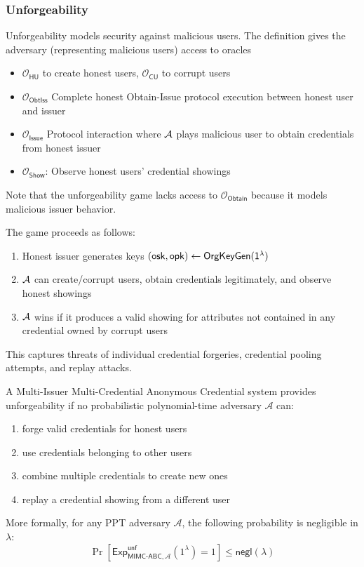 \newpage

\subsubsection{Unforgeability}
Unforgeability models security against malicious users. The definition gives the adversary (representing malicious users) access to oracles 
\begin{itemize}
    \item $\mathcal{O}_{\mathsf{HU}}$ to create honest users, $\mathcal{O}_{\mathsf{CU}}$ to corrupt users
    \item $\mathcal{O}_{\mathsf{ObtIss}}$ Complete honest Obtain-Issue protocol execution between honest user and issuer
    \item $\mathcal{O}_{\mathsf{Issue}}$ Protocol interaction where $\mathcal{A}$ plays malicious user to obtain credentials from honest issuer
    \item $\mathcal{O}_{\mathsf{Show}}$: Observe honest users' credential showings
\end{itemize}
Note that the unforgeability game lacks access to $\mathcal{O}_{\mathsf{Obtain}}$ because it models malicious issuer behavior. 

\noindent The game proceeds as follows:
\begin{enumerate}
    \item Honest issuer generates keys $(\mathsf{osk}, \mathsf{opk}) \gets \mathsf{OrgKeyGen(\mathsf{1^{\lambda}})}$
    \item $\mathcal{A}$ can create/corrupt users, obtain credentials legitimately, and observe honest showings
    \item $\mathcal{A}$ wins if it produces a valid showing for attributes not contained in any credential owned by corrupt users
\end{enumerate}
This captures threats of individual credential forgeries, credential pooling attempts, and replay attacks.

\begin{definition}
\noindent A Multi-Issuer Multi-Credential Anonymous Credential system provides unforgeability if no probabilistic polynomial-time adversary $\mathcal{A}$ can:
\begin{enumerate}
    \item forge valid credentials for honest users
    \item use credentials belonging to other users
    \item combine multiple credentials to create new ones
    \item replay a credential showing from a different user
\end{enumerate}

\noindent More formally, for any PPT adversary $\mathcal{A}$, the following probability is negligible in $\lambda$:
\[ \Pr[\mathsf{Exp}^{\mathsf{unf}}_{\mathsf{MIMC\mbox{-}ABC},\mathcal{A}}(1^\lambda) = 1] \leq \mathsf{negl}(\lambda) \]
\end{definition}

